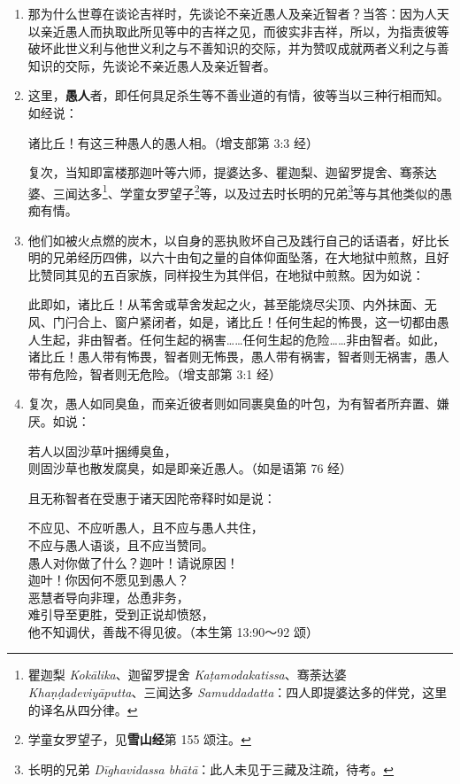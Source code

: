 \begin{enumerate}
\item 那为什么世尊在谈论吉祥时，先谈论不亲近愚人及亲近智者？当答：因为人天以亲近愚人而执取此所见等中的吉祥之见，而彼实非吉祥，所以，为指责彼等破坏此世义利与他世义利之与不善知识的交际，并为赞叹成就两者义利之与善知识的交际，先谈论不亲近愚人及亲近智者。
\item 这里，\textbf{愚人}者，即任何具足杀生等不善业道的有情，彼等当以三种行相而知。如经说：\begin{quoting}诸比丘！有这三种愚人的愚人相。（增支部第 3:3 经）\end{quoting}复次，当知即富楼那迦叶等六师，提婆达多、瞿迦梨、迦留罗提舍、骞荼达婆、三闻达多\footnote{瞿迦梨 \textit{Kokālika}、迦留罗提舍 \textit{Kaṭamodakatissa}、骞荼达婆 \textit{Khaṇḍadeviyāputta}、三闻达多 \textit{Samuddadatta}：四人即提婆达多的伴党，这里的译名从四分律。}、学童女罗望子\footnote{学童女罗望子，见\textbf{雪山经}第 155 颂注。}等，以及过去时长明的兄弟\footnote{长明的兄弟 \textit{Dīghavidassa bhātā}：此人未见于三藏及注疏，待考。}等与其他类似的愚痴有情。
\item 他们如被火点燃的炭木，以自身的恶执败坏自己及践行自己的话语者，好比长明的兄弟经历四佛，以六十由旬之量的自体仰面坠落，在大地狱中煎熬，且好比赞同其见的五百家族，同样投生为其伴侣，在地狱中煎熬。因为如说：\begin{quoting}此即如，诸比丘！从苇舍或草舍发起之火，甚至能烧尽尖顶、内外抹面、无风、门闩合上、窗户紧闭者，如是，诸比丘！任何生起的怖畏，这一切都由愚人生起，非由智者。任何生起的祸害……任何生起的危险……非由智者。如此，诸比丘！愚人带有怖畏，智者则无怖畏，愚人带有祸害，智者则无祸害，愚人带有危险，智者则无危险。（增支部第 3:1 经）\end{quoting}
\item 复次，愚人如同臭鱼，而亲近彼者则如同裹臭鱼的叶包，为有智者所弃置、嫌厌。如说：\begin{quoting}若人以固沙草叶捆缚臭鱼，\\则固沙草也散发腐臭，如是即亲近愚人。（如是语第 76 经）\end{quoting}且无称智者在受惠于诸天因陀帝释时如是说：\begin{quoting}不应见、不应听愚人，且不应与愚人共住，\\不应与愚人语谈，且不应当赞同。\\愚人对你做了什么？迦叶！请说原因！\\迦叶！你因何不愿见到愚人？\\恶慧者导向非理，怂恿非务，\\难引导至更胜，受到正说却愤怒，\\他不知调伏，善哉不得见彼。（本生第 13:90～92 颂）\end{quoting}

\end{enumerate}

